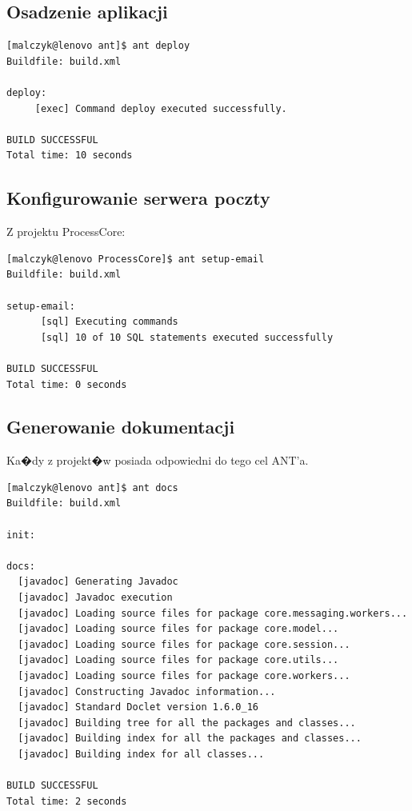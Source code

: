 \documentclass{article}
\begin{document}
\subsection{Osadzenie aplikacji}
{\tiny
\begin{verbatim}
[malczyk@lenovo ant]$ ant deploy
Buildfile: build.xml

deploy:
     [exec] Command deploy executed successfully.

BUILD SUCCESSFUL
Total time: 10 seconds

\end{verbatim}
}

\subsection{Konfigurowanie serwera poczty}
Z projektu ProcessCore:
{\tiny
\begin{verbatim}
[malczyk@lenovo ProcessCore]$ ant setup-email
Buildfile: build.xml

setup-email:
      [sql] Executing commands
      [sql] 10 of 10 SQL statements executed successfully

BUILD SUCCESSFUL
Total time: 0 seconds
\end{verbatim}
}

\subsection{Generowanie dokumentacji}
Ka�dy z projekt�w posiada odpowiedni do tego cel ANT'a.

{\tiny
\begin{verbatim}
[malczyk@lenovo ant]$ ant docs
Buildfile: build.xml

init:

docs:
  [javadoc] Generating Javadoc
  [javadoc] Javadoc execution
  [javadoc] Loading source files for package core.messaging.workers...
  [javadoc] Loading source files for package core.model...
  [javadoc] Loading source files for package core.session...
  [javadoc] Loading source files for package core.utils...
  [javadoc] Loading source files for package core.workers...
  [javadoc] Constructing Javadoc information...
  [javadoc] Standard Doclet version 1.6.0_16
  [javadoc] Building tree for all the packages and classes...
  [javadoc] Building index for all the packages and classes...
  [javadoc] Building index for all classes...

BUILD SUCCESSFUL
Total time: 2 seconds
\end{verbatim}
}
\end{document}
